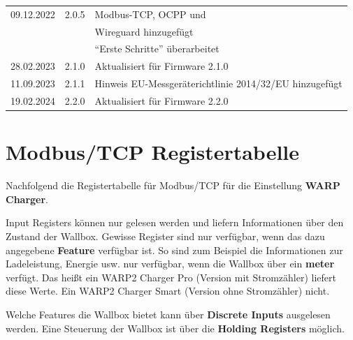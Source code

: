 \documentclass[a4paper,10pt]{article}
\begin{document}
\begin{multicols*}{2}
\begin{tabular}{lll}
		09.12.2022 & 2.0.5   & Modbus-TCP, OCPP und            \\
		           &         & Wireguard hinzugefügt           \\
		           &         & \enquote{Erste Schritte} überarbeitet \\
		28.02.2023 & 2.1.0   & Aktualisiert für Firmware 2.1.0 \\
		11.09.2023 & 2.1.1   & Hinweis EU-Messgeräterichtlinie 2014/32/EU hinzugefügt\\
		19.02.2024 & 2.2.0   & Aktualisiert für Firmware 2.2.0 \\
		\bottomrule
	\end{tabular}

	\vfill
	\null

	\columnbreak
\appendix

\section{Modbus/TCP Registertabelle}
\label{modbus_tcp_registertabelle}
Nachfolgend die Registertabelle für Modbus/TCP für die Einstellung \textbf{WARP
Charger}.

Input Registers können nur gelesen werden und liefern Informationen über den
Zustand der Wallbox. Gewisse Register sind nur verfügbar, wenn das dazu
angegebene \textbf{Feature} verfügbar ist. So sind zum Beispiel die
Informationen zur Ladeleistung, Energie usw. nur verfügbar, wenn die Wallbox
über ein \textbf{meter} verfügt. Das heißt ein WARP2 Charger Pro (Version mit
Stromzähler) liefert diese Werte. Ein WARP2 Charger Smart (Version ohne
Stromzähler) nicht.

Welche Features die Wallbox bietet kann über \textbf{Discrete Inputs} ausgelesen
werden. Eine Steuerung der Wallbox ist über die \textbf{Holding Registers}
möglich.

\end{multicols*}
\end{document}
